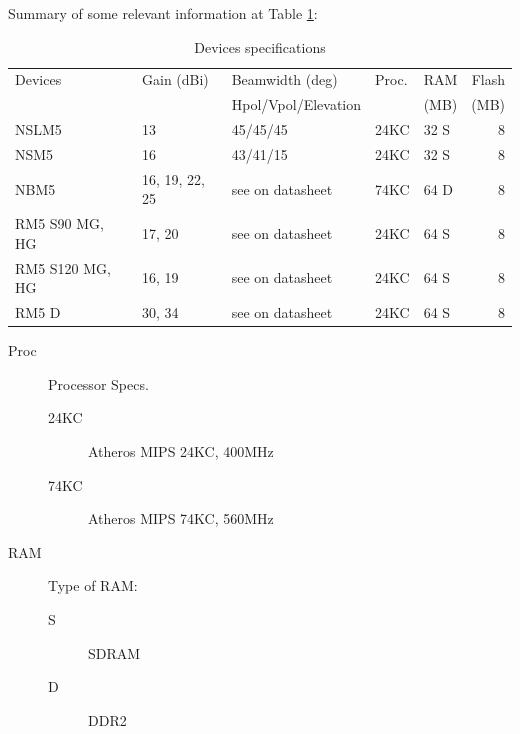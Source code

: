 \documentclass[11pt]{article}
\begin{document}
Summary of some relevant information at Table \ref{tab:devspec}:
\begin{table}[htb]
\caption{\label{tab:devspec}Devices specifications}
\centering
\begin{tabular}{lllllr}
Devices & Gain (dBi) & Beamwidth (deg) & Proc. & RAM & Flash\\
 &  & Hpol/Vpol/Elevation &  & (MB) & (MB)\\
\hline
NSLM5 & 13 & 45/45/45 & 24KC & 32 S & 8\\
NSM5 & 16 & 43/41/15 & 24KC & 32 S & 8\\
NBM5 & 16, 19, 22, 25 & see on datasheet & 74KC & 64 D & 8\\
RM5 S90 MG, HG & 17, 20 & see on datasheet & 24KC & 64 S & 8\\
RM5 S120 MG, HG & 16, 19 & see on datasheet & 24KC & 64 S & 8\\
RM5 D & 30, 34 & see on datasheet & 24KC & 64 S & 8\\
\end{tabular}
\end{table}

\begin{description}
\item[{Proc}] Processor Specs.
\begin{description}
\item[{24KC}] Atheros MIPS 24KC, 400MHz
\item[{74KC}] Atheros MIPS 74KC, 560MHz
\end{description}
\item[{RAM}] Type of RAM:
\begin{description}
\item[{S}] SDRAM
\item[{D}] DDR2
\end{description}
\end{description}
\end{document}

